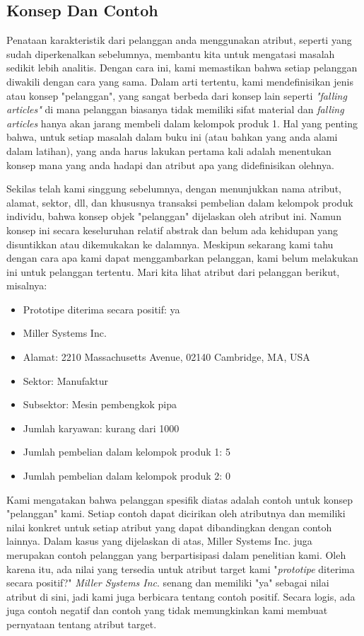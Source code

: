 \subsection{Konsep Dan Contoh}
\par Penataan karakteristik dari pelanggan anda menggunakan atribut, seperti yang sudah diperkenalkan sebelumnya, membantu kita untuk mengatasi masalah sedikit lebih analitis. Dengan cara ini, kami memastikan bahwa setiap pelanggan diwakili dengan cara yang sama. Dalam arti tertentu, kami mendefinisikan jenis atau konsep "pelanggan", yang sangat berbeda dari konsep lain seperti \textit{"falling articles"} di mana pelanggan biasanya tidak memiliki sifat material dan \textit{falling articles} hanya akan jarang membeli dalam kelompok produk 1. Hal yang penting bahwa, untuk setiap masalah dalam buku ini (atau bahkan yang anda alami dalam latihan), yang anda harus lakukan pertama kali adalah menentukan konsep mana yang anda hadapi dan atribut apa yang didefinisikan olehnya.
\par Sekilas telah kami singgung sebelumnya, dengan menunjukkan nama atribut, alamat, sektor, dll, dan khususnya transaksi pembelian dalam kelompok produk individu, bahwa konsep objek "pelanggan" dijelaskan oleh atribut ini. Namun konsep ini secara keseluruhan relatif abstrak dan belum ada kehidupan yang disuntikkan atau dikemukakan ke dalamnya. Meskipun sekarang kami tahu dengan cara apa kami dapat  menggambarkan pelanggan, kami belum melakukan ini untuk pelanggan tertentu. Mari kita lihat atribut dari pelanggan berikut, misalnya:

\begin{itemize}
    \item Prototipe diterima secara positif: ya
    \item Miller Systems Inc.
\item Alamat: 2210 Massachusetts Avenue, 02140 Cambridge, MA, USA
\item Sektor: Manufaktur
\item Subsektor: Mesin pembengkok pipa
\item Jumlah karyawan: 
kurang dari 1000
\item Jumlah pembelian dalam kelompok produk 1: 5
\item Jumlah pembelian dalam kelompok produk 2: 0 

\end{itemize}
\par Kami mengatakan bahwa pelanggan spesifik diatas adalah contoh untuk konsep "pelanggan" kami. Setiap contoh dapat dicirikan oleh atributnya dan memiliki nilai konkret untuk setiap atribut yang dapat dibandingkan dengan contoh lainnya. Dalam kasus yang dijelaskan di atas, Miller Systems Inc. juga merupakan contoh pelanggan yang berpartisipasi dalam penelitian kami. Oleh karena itu, ada nilai yang tersedia untuk atribut target kami "\textit{prototipe} diterima secara positif?" \textit{Miller Systems Inc}. senang dan memiliki "ya" sebagai nilai atribut di sini, jadi kami juga berbicara tentang contoh positif. Secara logis, ada juga contoh negatif dan contoh yang tidak memungkinkan kami membuat pernyataan tentang atribut target.

